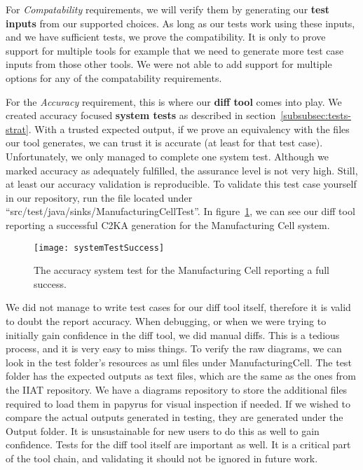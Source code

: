 For \textit{Compatability} requirements,
we will verify them by generating our \textbf{test inputs} from our supported choices.
As long as our tests work using these inputs, and we have sufficient tests, we prove the compatibility.
It is only to prove support for multiple tools for example that we need to generate more test case inputs from those other tools.
We were not able to add support for multiple options for any of the compatability requirements.

For the \textit{Accuracy} requirement, this is where our \textbf{diff tool} comes into play.
We created accuracy focused \textbf{system tests} as described in section~\ref{subsubsec:tests-strat}.
With a trusted expected output, if we prove an equivalency with the files our tool generates, we can trust it is accurate (at least for that test case).
Unfortunately, we only managed to complete one system test.
Although we marked accuracy as adequately fulfilled, the assurance level is not very high.
Still, at least our accuracy validation is reproducible.
To validate this test case yourself in our repository, run the file located under ``src/test/java/sinks/ManufacturingCellTest''.
In figure~\ref{fig:acc-test}, we can see our diff tool reporting a successful C2KA generation for the Manufacturing Cell system.

\begin{figure}
    \centering
    \texttt{[image: systemTestSuccess]}
    \caption{The accuracy system test for the Manufacturing Cell reporting a full success.}
    \label{fig:acc-test}
\end{figure}

We did not manage to write test cases for our diff tool itself, therefore it is valid to doubt the report accuracy.
When debugging, or when we were trying to initially gain confidence in the diff tool, we did manual diffs.
This is a tedious process, and it is very easy to miss things.
To verify the raw diagrams, we can look in the test folder's resources as uml files under ManufacturingCell.
The test folder has the expected outputs as text files, which are the same as the ones from the IIAT repository. %
We have a diagrams repository to store the additional files required to load them in papyrus for visual inspection if needed. %
If we wished to compare the actual outputs generated in testing, they are generated under the Output folder.
It is unsustainable for new users to do this as well to gain confidence.
Tests for the diff tool itself are important as well.
It is a critical part of the tool chain, and validating it should not be ignored in future work.

